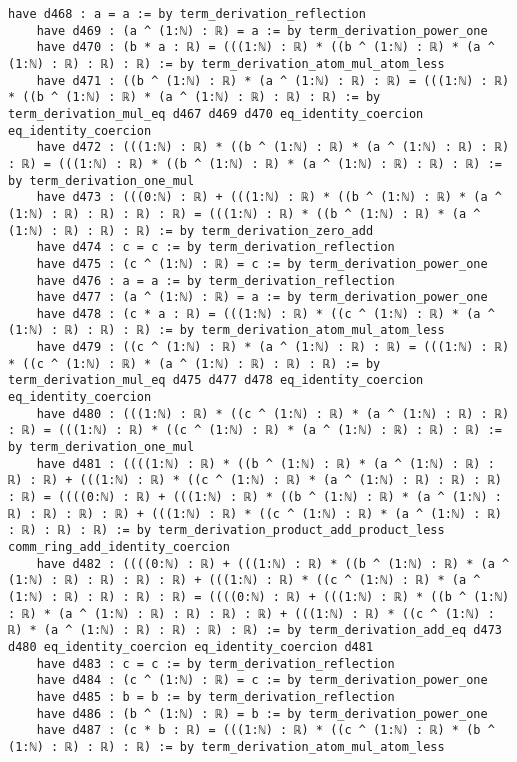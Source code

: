 \documentclass{article}
\begin{document}
\begin{tcolorbox}[colback=white!10, width=\linewidth]
\begin{lstlisting}[language=Lean4]
    have d468 : a = a := by term_derivation_reflection
    have d469 : (a ^ (1:ℕ) : ℝ) = a := by term_derivation_power_one
    have d470 : (b * a : ℝ) = (((1:ℕ) : ℝ) * ((b ^ (1:ℕ) : ℝ) * (a ^ (1:ℕ) : ℝ) : ℝ) : ℝ) := by term_derivation_atom_mul_atom_less
    have d471 : ((b ^ (1:ℕ) : ℝ) * (a ^ (1:ℕ) : ℝ) : ℝ) = (((1:ℕ) : ℝ) * ((b ^ (1:ℕ) : ℝ) * (a ^ (1:ℕ) : ℝ) : ℝ) : ℝ) := by term_derivation_mul_eq d467 d469 d470 eq_identity_coercion eq_identity_coercion
    have d472 : (((1:ℕ) : ℝ) * ((b ^ (1:ℕ) : ℝ) * (a ^ (1:ℕ) : ℝ) : ℝ) : ℝ) = (((1:ℕ) : ℝ) * ((b ^ (1:ℕ) : ℝ) * (a ^ (1:ℕ) : ℝ) : ℝ) : ℝ) := by term_derivation_one_mul
    have d473 : (((0:ℕ) : ℝ) + (((1:ℕ) : ℝ) * ((b ^ (1:ℕ) : ℝ) * (a ^ (1:ℕ) : ℝ) : ℝ) : ℝ) : ℝ) = (((1:ℕ) : ℝ) * ((b ^ (1:ℕ) : ℝ) * (a ^ (1:ℕ) : ℝ) : ℝ) : ℝ) := by term_derivation_zero_add
    have d474 : c = c := by term_derivation_reflection
    have d475 : (c ^ (1:ℕ) : ℝ) = c := by term_derivation_power_one
    have d476 : a = a := by term_derivation_reflection
    have d477 : (a ^ (1:ℕ) : ℝ) = a := by term_derivation_power_one
    have d478 : (c * a : ℝ) = (((1:ℕ) : ℝ) * ((c ^ (1:ℕ) : ℝ) * (a ^ (1:ℕ) : ℝ) : ℝ) : ℝ) := by term_derivation_atom_mul_atom_less
    have d479 : ((c ^ (1:ℕ) : ℝ) * (a ^ (1:ℕ) : ℝ) : ℝ) = (((1:ℕ) : ℝ) * ((c ^ (1:ℕ) : ℝ) * (a ^ (1:ℕ) : ℝ) : ℝ) : ℝ) := by term_derivation_mul_eq d475 d477 d478 eq_identity_coercion eq_identity_coercion
    have d480 : (((1:ℕ) : ℝ) * ((c ^ (1:ℕ) : ℝ) * (a ^ (1:ℕ) : ℝ) : ℝ) : ℝ) = (((1:ℕ) : ℝ) * ((c ^ (1:ℕ) : ℝ) * (a ^ (1:ℕ) : ℝ) : ℝ) : ℝ) := by term_derivation_one_mul
    have d481 : ((((1:ℕ) : ℝ) * ((b ^ (1:ℕ) : ℝ) * (a ^ (1:ℕ) : ℝ) : ℝ) : ℝ) + (((1:ℕ) : ℝ) * ((c ^ (1:ℕ) : ℝ) * (a ^ (1:ℕ) : ℝ) : ℝ) : ℝ) : ℝ) = ((((0:ℕ) : ℝ) + (((1:ℕ) : ℝ) * ((b ^ (1:ℕ) : ℝ) * (a ^ (1:ℕ) : ℝ) : ℝ) : ℝ) : ℝ) + (((1:ℕ) : ℝ) * ((c ^ (1:ℕ) : ℝ) * (a ^ (1:ℕ) : ℝ) : ℝ) : ℝ) : ℝ) := by term_derivation_product_add_product_less comm_ring_add_identity_coercion
    have d482 : ((((0:ℕ) : ℝ) + (((1:ℕ) : ℝ) * ((b ^ (1:ℕ) : ℝ) * (a ^ (1:ℕ) : ℝ) : ℝ) : ℝ) : ℝ) + (((1:ℕ) : ℝ) * ((c ^ (1:ℕ) : ℝ) * (a ^ (1:ℕ) : ℝ) : ℝ) : ℝ) : ℝ) = ((((0:ℕ) : ℝ) + (((1:ℕ) : ℝ) * ((b ^ (1:ℕ) : ℝ) * (a ^ (1:ℕ) : ℝ) : ℝ) : ℝ) : ℝ) + (((1:ℕ) : ℝ) * ((c ^ (1:ℕ) : ℝ) * (a ^ (1:ℕ) : ℝ) : ℝ) : ℝ) : ℝ) := by term_derivation_add_eq d473 d480 eq_identity_coercion eq_identity_coercion d481
    have d483 : c = c := by term_derivation_reflection
    have d484 : (c ^ (1:ℕ) : ℝ) = c := by term_derivation_power_one
    have d485 : b = b := by term_derivation_reflection
    have d486 : (b ^ (1:ℕ) : ℝ) = b := by term_derivation_power_one
    have d487 : (c * b : ℝ) = (((1:ℕ) : ℝ) * ((c ^ (1:ℕ) : ℝ) * (b ^ (1:ℕ) : ℝ) : ℝ) : ℝ) := by term_derivation_atom_mul_atom_less

\end{lstlisting}
\end{tcolorbox}
\end{document}
